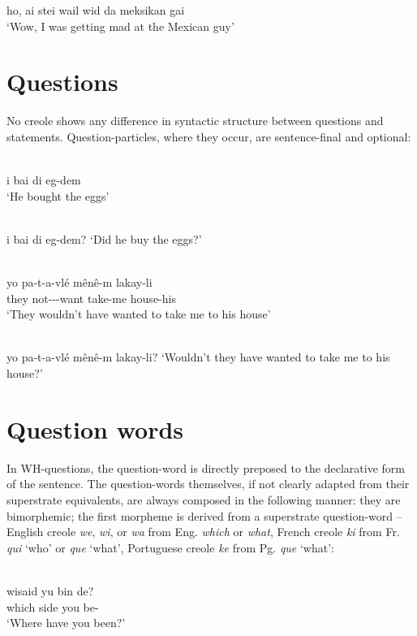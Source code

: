 \ea\label{ex:2:74}
 ho, ai stei wail wid da meksikan gai\\
\glt `Wow, I was getting mad at the Mexican guy'
\z


\section{Questions}
No creole shows any difference in syntactic structure between questions and statements. Question-particles, where they occur, are sentence-final and optional:

\ea\label{ex:2:75}
 \langinfo{\langGC}{}{}\\
 i bai di eg-dem\\
\glt `He bought the eggs'
\z

\ea\label{ex:2:76}
\langinfo{\langGC}{}{}\\
i bai di eg-dem?
\glt `Did he buy the eggs?'
\z

\ea\label{ex:2:77}
\langinfo{\langHC}{}{}\\
\gll yo pa-t-a-vlé m{\^e}n{\^e}-m lakay-li\\
they not-\TNS-\MOD-want take-me house-his\\
\glt `They wouldn't have wanted to take me to his house'
\z

\ea\label{ex:2:78}
\langinfo{\langHC}{}{}\\
yo pa-t-a-vlé m{\^e}n{\^e}-m lakay-li?
\glt `Wouldn't they have wanted to take me to his house?'
\z
\section{Question words}

In WH-questions, the question-word is directly preposed to the declarative form of the sentence. The question-words themselves, if not clearly adapted from their superstrate equivalents, are always composed in the following manner: they are bimorphemic; the first morpheme is derived from a superstrate question-word -- English creole \textit{we}, \textit{wi}, or \textit{wa} from Eng. \textit{which} or \textit{what}, French creole \textit{ki} from Fr. \textit{qui} `who' or \textit{que} `what', Portuguese creole \textit{ke} from Pg. \textit{que} `what':

\ea\label{ex:2:79}
\langinfo{\langGC}{}{}\\
 \gll wisaid yu bin de?\\
{which side} you {\TNS} be-\LOC \\
\glt `Where have you been?'
\z

